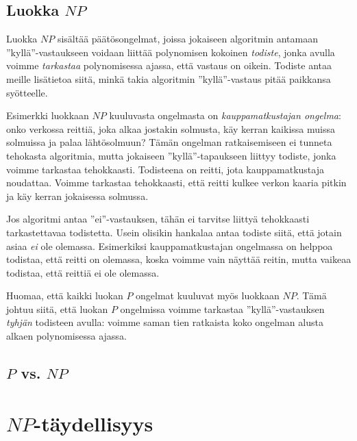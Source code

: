 \subsection{Luokka $NP$}

Luokka $NP$ sisältää päätösongelmat, joissa jokaiseen
algoritmin antamaan ''kyllä''-vastaukseen voidaan liittää
polynomisen kokoinen \emph{todiste}, jonka avulla voimme
\emph{tarkastaa} polynomisessa ajassa, että vastaus on oikein.
Todiste antaa meille lisätietoa siitä,
minkä takia algoritmin ''kyllä''-vastaus
pitää paikkansa syötteelle.

Esimerkki luokkaan $NP$ kuuluvasta ongelmasta on
\emph{kauppamatkustajan ongelma}: onko verkossa reittiä,
joka alkaa jostakin solmusta, käy kerran kaikissa muissa
solmuissa ja palaa lähtösolmuun?
Tämän ongelman ratkaisemiseen ei tunneta tehokasta algoritmia,
mutta jokaiseen ''kyllä''-tapaukseen liittyy todiste,
jonka voimme tarkastaa tehokkaasti.
Todisteena on reitti, jota kauppamatkustaja noudattaa.
Voimme tarkastaa tehokkaasti, että reitti kulkee verkon
kaaria pitkin ja käy kerran jokaisessa solmussa.

Jos algoritmi antaa ''ei''-vastauksen, tähän ei tarvitse
liittyä tehokkaasti tarkastettavaa todistetta.
Usein olisikin hankalaa antaa todiste siitä, että jotain
asiaa \emph{ei} ole olemassa.
Esimerkiksi kauppamatkustajan ongelmassa on helppoa
todistaa, että reitti on olemassa, koska voimme vain
näyttää reitin, mutta vaikeaa todistaa, että reittiä ei ole olemassa.

Huomaa, että kaikki luokan $P$ ongelmat kuuluvat myös
luokkaan $NP$. Tämä johtuu siitä, että luokan $P$ ongelmissa
voimme tarkastaa ''kyllä''-vastauksen
\emph{tyhjän} todisteen avulla: voimme saman tien ratkaista
koko ongelman alusta alkaen polynomisessa ajassa.

\subsection{$P$ vs. $NP$}

\section{$NP$-täydellisyys}